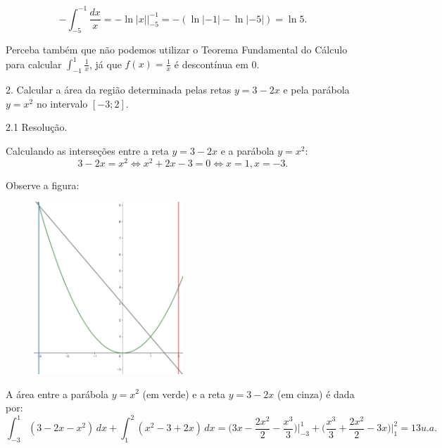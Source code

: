 \documentclass{article}
\begin{document}
{\begin{newpage}
\begin{equation*} \displaystyle{-\int_{-5}^{-1} \frac{dx}{x} = -\ln{|x|}\Big|^{-1}_{-5} = -(\ln{|-1|} - \ln{|-5|}) = \ln{5}}. \end{equation*}
\par Perceba também que não podemos utilizar o Teorema Fundamental do Cálculo para calcular $\displaystyle{\int_{-1}^{1} \frac{1}{x}}$, já que $f(x) = \displaystyle{\frac{1}{x}}$ é descontínua em 0. 
\par
\vspace{0.3cm}
\begin{flushleft}
2. Calcular a área da região determinada pelas retas $y=3-2x$ e pela parábola $y=x^2$ no intervalo $[-3;2]$.
\end{flushleft}
\par
\vspace{0.3cm}
\begin{flushleft}
2.1 Resolução.
\end{flushleft}
\par Calculando as interseções entre a reta $y=3-2x$ e a parábola $y=x^2$:
\begin{equation*} 3-2x = x^2 \Leftrightarrow x^2 + 2x - 3 = 0 \Leftrightarrow x=1, x=-3.\end{equation*}
\par Observe a figura:
\begin{figure}[htbp]
\begin{center}
\includegraphics[width=0.5\textwidth, angle=0]{Grafico13.png}
\end{center}
\end{figure}
\par A área entre a parábola $y=x^2$ (em verde) e a reta $y=3-2x$ (em cinza) é dada por:
\begin{equation*}\displaystyle{\int_{-3}^{1} (3 - 2x - x^{2})\, dx + \int_{1}^{2} (x^{2} - 3 + 2x)\, dx = \Big( 3x - \frac{2x^2}{2} - \frac{x^3}{3}\Big)\Big|^{1}_{-3} + \Big( \frac{x^3}{3} + \frac{2x^2}{2} - 3x \Big)\Big|^{2}_{1} = 13 u.a.}\end{equation*}

\end{newpage}}
\end{document}
